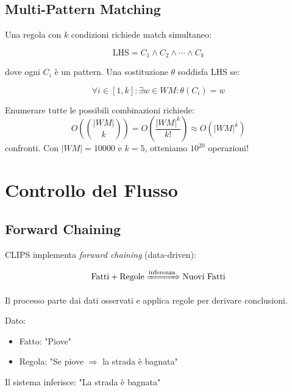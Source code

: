 \subsection{Multi-Pattern Matching}

Una regola con $k$ condizioni richiede match simultaneo:

\begin{equation}
\text{LHS} = C_1 \land C_2 \land \cdots \land C_k
\end{equation}

dove ogni $C_i$ è un pattern. Una sostituzione $\theta$ soddisfa LHS se:

\begin{equation}
\forall i \in [1, k]: \exists w \in WM: \theta(C_i) = w
\end{equation}

\begin{osservazione}
Enumerare tutte le possibili combinazioni richiede:
\begin{equation}
O\left(\binom{|WM|}{k}\right) = O\left(\frac{|WM|^k}{k!}\right) \approx O(|WM|^k)
\end{equation}
confronti. Con $|WM| = 10000$ e $k = 5$, otteniamo $10^{20}$ operazioni!
\end{osservazione}

\section{Controllo del Flusso}

\subsection{Forward Chaining}

CLIPS implementa \textit{forward chaining} (data-driven):

\begin{equation}
\text{Fatti} + \text{Regole} \xRightarrow{\text{inferenza}} \text{Nuovi Fatti}
\end{equation}

Il processo parte dai dati osservati e applica regole per derivare conclusioni.

\begin{esempio}
Dato:
\begin{itemize}
\item Fatto: "Piove"
\item Regola: "Se piove $\Rightarrow$ la strada è bagnata"
\end{itemize}

Il sistema inferisce: "La strada è bagnata"
\end{esempio}

